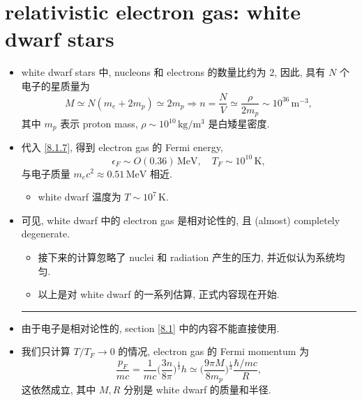 \section{relativistic electron gas: white dwarf stars}
\begin{itemize}
	\item white dwarf stars 中, nucleons 和 electrons 的数量比约为 $2$, 因此, 具有 $N$ 个电子的星质量为
	\begin{equation}
		M \simeq N (m_e + 2 m_p) \simeq 2 m_p \Longrightarrow n = \frac{N}{V} \simeq \frac{\rho}{2 m_p} \sim 10^{36} \, \text{m}^{- 3},
	\end{equation}
	其中 $m_p$ 表示 proton mass, $\rho \sim 10^{10} \, \text{kg}/\text{m}^3$ 是白矮星密度.
	
	\item 代入 \eqref{8.1.7}, 得到 electron gas 的 Fermi energy,
	\begin{equation}
		\epsilon_F \sim O(0.36) \, \text{MeV}, \quad T_F \sim 10^{10} \, \text{K},
	\end{equation}
	与电子质量 $m_e c^2 \approx 0.51 \, \text{MeV}$ 相近.
	\begin{itemize}
		\item white dwarf 温度为 $T \sim 10^7 \, \text{K}$.
	\end{itemize}
	
	\item 可见, white dwarf 中的 electron gas 是相对论性的, 且 (almost) completely degenerate.
	\begin{itemize}
		\item 接下来的计算忽略了 nuclei 和 radiation 产生的压力, 并近似认为系统均匀.
		
		\item 以上是对 white dwarf 的一系列估算, 正式内容现在开始.
	\end{itemize}
	
	\noindent\rule[0.5ex]{\linewidth}{0.5pt} %
	
	\item 由于电子是相对论性的, section \ref{8.1} 中的内容不能直接使用.
	
	\item 我们只计算 $T / T_F \rightarrow 0$ 的情况, electron gas 的 Fermi momentum 为
	\begin{equation} \label{8.4.3}
		\frac{p_F}{m c} = \frac{1}{m c} \Big( \frac{3 n}{8 \pi} \Big)^{\frac{1}{3}} h \simeq \Big( \frac{9 \pi M}{8 m_p} \Big)^{\frac{1}{3}} \frac{\hbar / m c}{R},
	\end{equation}
	这依然成立, 其中 $M, R$ 分别是 white dwarf 的质量和半径.
	

\end{itemize}
